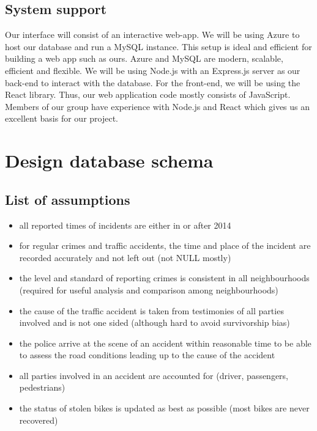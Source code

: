 \documentclass[12pt, a4paper]{article}
\begin{document}
\subsection*{System support}
Our interface will consist of an interactive web-app. We will be using Azure to host our database and run a MySQL instance. This setup is ideal and efficient for building a web app such as ours. Azure and MySQL are modern, scalable, efficient and flexible. We will be using Node.js with an Express.js server as our back-end to interact with the database. For the front-end, we will be using the React library. Thus, our web application code mostly consists of JavaScript. Members of our group have experience with Node.js and React which gives us an excellent basis for our project.

\section*{Design database schema}
\subsection*{List of assumptions}
\begin{itemize}
    \item all reported times of incidents are either in or after 2014
    \item for regular crimes and traffic accidents, the time and place of the incident are recorded accurately and not left out (not NULL mostly)
    \item the level and standard of reporting crimes is consistent in all neighbourhoods (required for useful analysis and comparison among neighbourhoods)
    \item the cause of the traffic accident is taken from testimonies of all parties involved and is not one sided (although hard to avoid survivorship bias)
    \item the police arrive at the scene of an accident within reasonable time to be able to assess the road conditions leading up to the cause of the accident
    \item all parties involved in an accident are accounted for (driver, passengers, pedestrians)
    \item the status of stolen bikes is updated as best as possible (most bikes are never recovered)
\end{itemize}
\end{document}

